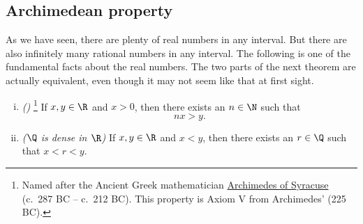\subsection{Archimedean property}

As we have seen, there are plenty of real numbers in any interval.  But
there are also infinitely many rational numbers in any interval.  The
following is one of the fundamental facts about the real numbers.
The two parts of the next theorem are actually equivalent, even though it may
not seem like that at first sight.


\begin{thm} \label{thm:arch}
\pagebreak[3]
\leavevmode
\begin{enumerate}[(i)]
\item \label{thm:arch:i} \emph{()}%
\footnote{Named after the Ancient Greek mathematician
\href{https://en.wikipedia.org/wiki/Archimedes}{Archimedes of Syracuse}
(c.\ 287 BC -- c.\ 212 BC)\@.
This property is Axiom V from Archimedes'  (225 BC)\@.}
If $x, y \in \R$ and
$x > 0$, then there exists an $n \in \N$ such that
\begin{equation*}
nx > y .
\end{equation*}
\item \label{thm:arch:ii} \emph{($\Q$ is dense in $\R$)} If $x, y \in \R$ and
$x < y$, then there exists an $r \in \Q$ such that
$x < r < y$.
\end{enumerate}
\end{thm}

